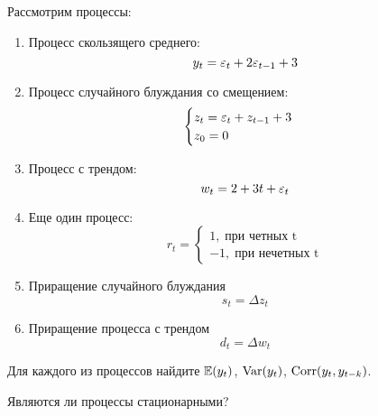 \begin{problem}
Рассмотрим процессы:

\begin{enumerate}
\item Процесс скользящего среднего:
\[
y_t=\varepsilon_t+2\varepsilon_{t-1}+3
\]

\item Процесс случайного блуждания со смещением:
\[
\begin{cases}
z_t=\varepsilon_t+z_{t-1}+3 \\
z_0=0
\end{cases}
\]

\item Процесс с трендом:
\[
w_t=2+3t+\varepsilon_t
\]

\item Еще один процесс:
\[
r_t=\begin{cases}
1, \; \text{при четных t} \\
-1, \; \text{при нечетных t}
\end{cases}
\]

\item Приращение случайного блуждания
\[
s_t=\Delta z_t
\]

\item Приращение процесса с трендом
\[
d_t=\Delta w_t
\]
\end{enumerate}

Для каждого из процессов найдите $\mathbb{E}(y_t)$, $\operatorname{Var}(y_t)$, $\operatorname{Corr}(y_t,y_{t-k})$.

Являются ли процессы стационарными?

\begin{sol}
\end{sol}
\end{problem}






